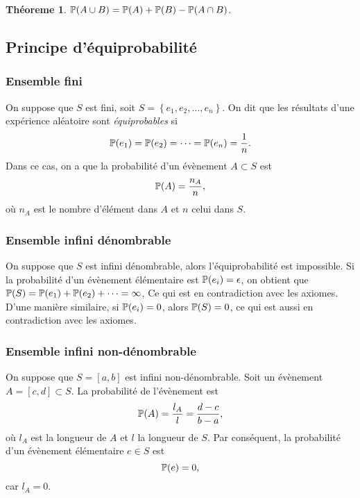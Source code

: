 \documentclass[11pt]{article}
\renewcommand\P{%
	\ensuremath{%
		\mathbb{P}%
	}%
}%
\newtheorem{theoreme}{Théoreme}[section]
\begin{document}
\begin{theoreme}
	$\P(A\cup B)=\P(A)+\P(B)-\P(A\cap B)$.
\end{theoreme}

\subsection{Principe d'équiprobabilité}
\subsubsection{Ensemble fini}
On suppose que $S$ est fini, soit $S=\left\{e_1,e_2,\dots,e_n\right\}$. On dit
que les résultats d'une expérience aléatoire sont \textit{équiprobables} si
\begin{equation*}
	\P(e_1)=\P(e_2)=\cdots=\P(e_n)=\frac{1}{n}.
\end{equation*}
Dans ce cas, on a que la probabilité d'un évènement $A\subset S$ est
\begin{equation*}
	\P(A)=\frac{n_A}{n},
\end{equation*}
où $n_A$ est le nombre d'élément dans $A$ et $n$ celui dans $S$.

\subsubsection{Ensemble infini dénombrable}
On suppose que $S$ est infini dénombrable, alors l'équiprobabilité est
impossible. Si la probabilité d'un évènement élémentaire est $\P(e_i)=\epsilon$,
on obtient que $\P(S)=\P(e_1)+\P(e_2)+\cdots=\infty$, Ce qui est en contradiction
avec les axiomes. D'une manière similaire, si $\P(e_i)=0$, alors $\P(S)=0$, ce
qui est aussi en contradiction avec les axiomes.

\subsubsection{Ensemble infini non-dénombrable}
On suppose que $S=[a,b]$ est infini non-dénombrable. Soit un évènement
$A=[c,d]\subset S$. La probabilité de l'évènement est
\begin{equation*}
	\P(A)=\frac{l_A}{l}=\frac{d-c}{b-a},
\end{equation*}
où $l_A$ est la longueur de $A$ et $l$ la longueur de $S$. Par conséquent, la
probabilité d'un évènement élémentaire $e\in S$ est
\begin{equation*}
	\P(e)=0,
\end{equation*}
car $l_A=0$.
\end{document}
